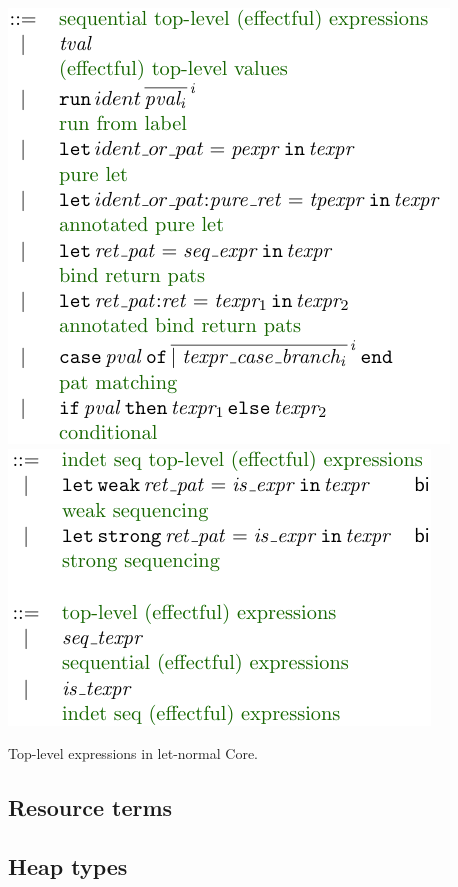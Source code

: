 \begin{marginfigure}
    \includegraphics{figures/kernel-seq-texpr}
    \includegraphics{figures/kernel-texpr}
    \caption{Top-level expressions in let-normal Core.}\label{fig:kernel-texpr}
\end{marginfigure}

\subsection{Resource terms}\label{subsec:res-terms}

\subsection{Heap types}\label{subsec:heap-types}

